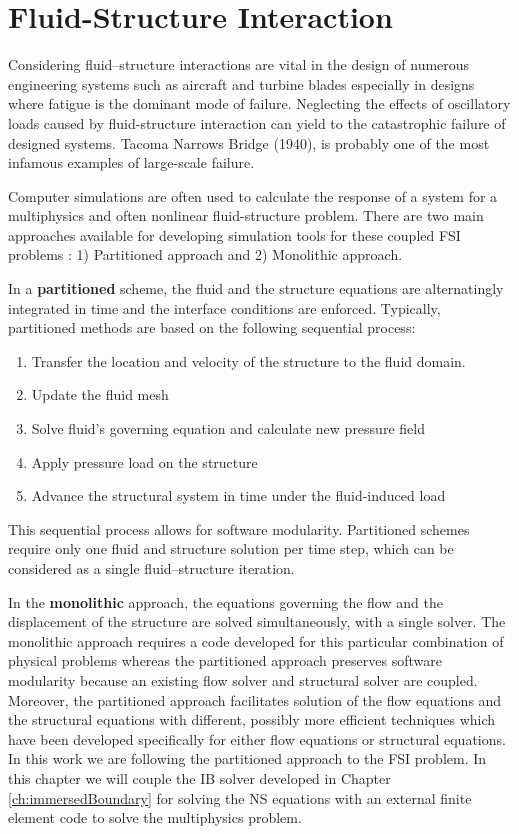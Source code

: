 \section{Fluid-Structure Interaction}
Considering fluid–structure interactions are vital in the design of numerous engineering systems such as aircraft and turbine blades especially in designs where fatigue is the dominant mode of failure. Neglecting the effects of oscillatory loads caused by fluid-structure interaction can yield to the catastrophic failure of designed systems. Tacoma Narrows Bridge (1940), is probably one of the most infamous examples of large-scale failure.

Computer simulations are often used to calculate the response of a system for a multiphysics and often nonlinear fluid-structure problem. There are two main approaches available for developing simulation tools for these coupled FSI problems \cite{michler2004monolithic}: 1) Partitioned approach and 2) Monolithic approach.

In a \textbf{partitioned} scheme, the fluid and the structure equations are alternatingly integrated in
time and the interface conditions are enforced. Typically, partitioned methods are based on the following sequential process:

\begin{enumerate}
	\item Transfer the location and velocity of the structure to the fluid domain.
	\item Update the fluid mesh
	\item Solve fluid's governing equation and calculate new pressure field
	\item Apply pressure load on the structure
	\item Advance the structural system in time under the fluid-induced load
\end{enumerate}

This sequential process allows for software modularity. Partitioned schemes require only one fluid
and structure solution per time step, which can be considered as a single fluid–structure iteration.

In the \textbf{monolithic} approach, the equations governing the flow and the displacement of the structure are solved simultaneously, with a single solver. The monolithic approach requires a code developed for this particular combination of physical problems whereas the partitioned approach preserves software modularity because an existing flow solver and structural solver are coupled. Moreover, the partitioned approach facilitates solution of the flow equations and the structural equations with different, possibly more efficient techniques which have been developed specifically for either flow equations or structural equations. In this work we are following the partitioned approach to the FSI problem. In this chapter we will couple the IB solver developed in Chapter \ref{ch:immersedBoundary} for solving the NS equations with an external finite element code to solve the multiphysics problem.

